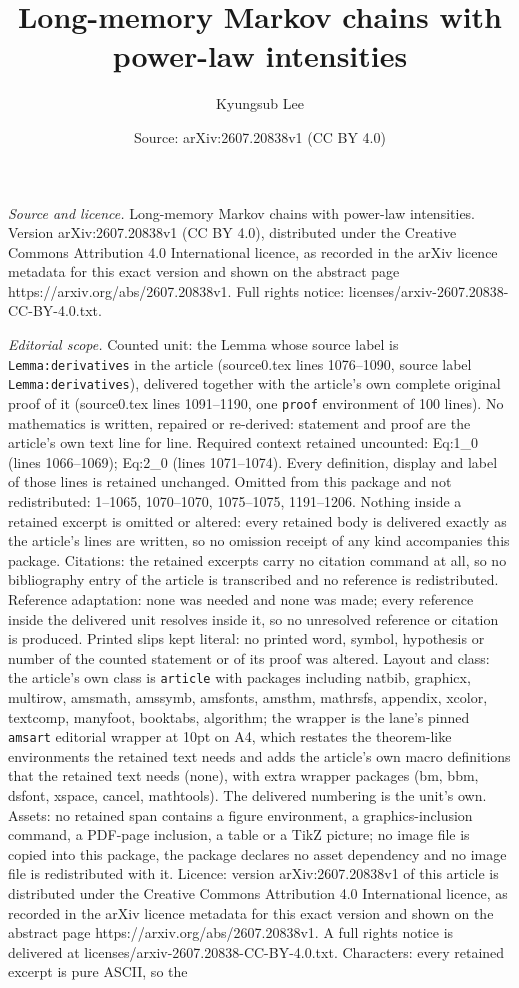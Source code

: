 \documentclass[10pt,a4paper]{amsart}
\title[Long-memory Markov chains with power-law intensities]{Long-memory Markov chains with power-law intensities}
\author{Kyungsub Lee}
\date{Source: arXiv:2607.20838v1 (CC BY 4.0)}
\begin{document}
\maketitle

\noindent\emph{Source and licence.} Long-memory Markov chains with power-law intensities. Version arXiv:2607.20838v1 (CC BY 4.0), distributed under the Creative Commons Attribution 4.0 International licence, as recorded in the arXiv licence metadata for this exact version and shown on the abstract page https://arxiv.org/abs/2607.20838v1. Full rights notice: licenses/arxiv-2607.20838-CC-BY-4.0.txt.\par\smallskip

\noindent\textit{Editorial scope.} Counted unit: the Lemma whose source label is \texttt{Lemma:derivatives} in the article (source0.tex lines 1076--1090, source label \texttt{Lemma:derivatives}), delivered together with the article's own complete original proof of it (source0.tex lines 1091--1190, one \texttt{proof} environment of 100 lines). No mathematics is written, repaired or re-derived: statement and proof are the article's own text line for line. Required context retained uncounted: Eq:1\_0 (lines 1066--1069); Eq:2\_0 (lines 1071--1074). Every definition, display and label of those lines is retained unchanged. Omitted from this package and not redistributed: 1--1065, 1070--1070, 1075--1075, 1191--1206. Nothing inside a retained excerpt is omitted or altered: every retained body is delivered exactly as the article's lines are written, so no omission receipt of any kind accompanies this package. Citations: the retained excerpts carry no citation command at all, so no bibliography entry of the article is transcribed and no reference is redistributed. Reference adaptation: none was needed and none was made; every reference inside the delivered unit resolves inside it, so no unresolved reference or citation is produced. Printed slips kept literal: no printed word, symbol, hypothesis or number of the counted statement or of its proof was altered. Layout and class: the article's own class is \texttt{article} with packages including natbib, graphicx, multirow, amsmath, amssymb, amsfonts, amsthm, mathrsfs, appendix, xcolor, textcomp, manyfoot, booktabs, algorithm; the wrapper is the lane's pinned \texttt{amsart} editorial wrapper at 10pt on A4, which restates the theorem-like environments the retained text needs and adds the article's own macro definitions that the retained text needs (none), with extra wrapper packages (bm, bbm, dsfont, xspace, cancel, mathtools). The delivered numbering is the unit's own. Assets: no retained span contains a figure environment, a graphics-inclusion command, a PDF-page inclusion, a table or a TikZ picture; no image file is copied into this package, the package declares no asset dependency and no image file is redistributed with it. Licence: version arXiv:2607.20838v1 of this article is distributed under the Creative Commons Attribution 4.0 International licence, as recorded in the arXiv licence metadata for this exact version and shown on the abstract page https://arxiv.org/abs/2607.20838v1. A full rights notice is delivered at licenses/arxiv-2607.20838-CC-BY-4.0.txt. Characters: every retained excerpt is pure ASCII, so the 
\end{document}
